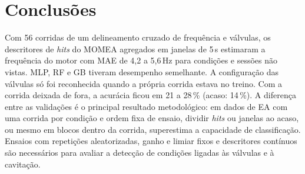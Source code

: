 \documentclass[12pt]{article}
\begin{document}
\section{Conclusões}
\label{sec:conclusoes}

Com 56 corridas de um delineamento cruzado de frequência e válvulas, os descritores de \textit{hits} do MOMEA agregados em janelas de 5\,s estimaram a frequência do motor com MAE de 4,2 a 5,6\,Hz para condições e sessões não vistas. MLP, RF e GB tiveram desempenho semelhante. A configuração das válvulas só foi reconhecida quando a própria corrida estava no treino. Com a corrida deixada de fora, a acurácia ficou em 21 a 28\,\% (acaso: 14\,\%). A diferença entre as validações é o principal resultado metodológico: em dados de EA com uma corrida por condição e ordem fixa de ensaio, dividir \textit{hits} ou janelas ao acaso, ou mesmo em blocos dentro da corrida, superestima a capacidade de classificação. Ensaios com repetições aleatorizadas, ganho e limiar fixos e descritores contínuos são necessários para avaliar a detecção de condições ligadas às válvulas e à cavitação.
\end{document}
